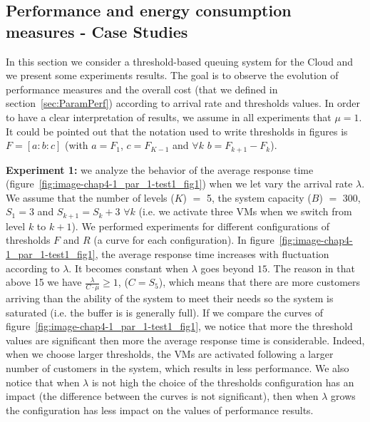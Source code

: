 \documentclass[conference]{IEEEtran}
\begin{document}
\subsection{Performance and energy consumption measures - Case Studies}
\label{BBB}
In this section we consider a threshold-based queuing system for the Cloud and we present some experiments results. 
The goal is to observe the evolution of performance measures and the overall cost (that we defined in section~\ref{sec:ParamPerf}) according to arrival 
rate and thresholds values. In order to have a clear interpretation of results, we assume in all experiments that $\mu=1$.
It could be pointed out that the notation used to write thresholds in figures is $F=[a:b:c]$ 
(with $a=F_1$, $c=F_{K-1}$ and $\forall k$ $b=F_{k+1}-F_{k}$). 

\textbf{Experiment 1:} we analyze the behavior of the average response time (figure~\ref{fig:image-chap4-1_par_1-test1_fig1}) 
when we let vary the arrival rate $\lambda$. We assume that the number of levels ($K$) $=$ 5, 
the system capacity ($B$) $=$ 300, $S_{1}=3$ and $S_{k+1}=S_{k}+3$ $\forall k$ (i.e. we activate three VMs when we switch from level $k$ to $k+1$). We performed experiments for different configurations of thresholds 
$F$ and $R$ (a curve for each configuration). In figure~\ref{fig:image-chap4-1_par_1-test1_fig1}, the average response time increases with fluctuation according 
to $\lambda$. It becomes constant when $\lambda$ goes beyond $15$. The reason in that above 15 we have 
$\frac{\lambda} {C \cdot \mu} \geq 1$, ($C=S_{5}$), which means that there are more customers arriving than the ability of the system to meet their needs so the system is saturated (i.e. the buffer is is generally full). If we compare the curves of figure~\ref{fig:image-chap4-1_par_1-test1_fig1}, we notice that more the threshold values are significant then more the average response time is considerable. 
Indeed, when we choose larger thresholds, the VMs are activated following a larger number of customers in the system, which results in less performance.
We also notice that when $\lambda$ is not high the choice of the thresholds configuration has an impact 
(the difference between the curves is not significant), then when $\lambda$ grows the configuration has less impact on the values of performance results.

\end{document}
